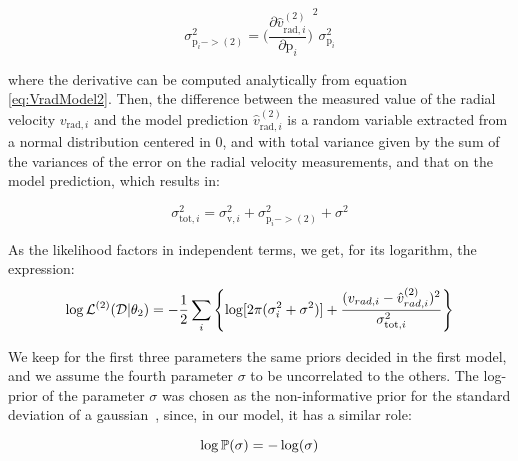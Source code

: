 \begin{equation}\label{eq:ParallaxErrorPropagation}
    \sigma^2_{\text{p}_i -> (2)} = {\biggl( \frac{\partial \hat{v}^{(2)}_{\text{rad}, i}}{\partial \text{p}_i} \biggr)}^2 \sigma^2_{\text{p}_i}
\end{equation}

\noindent
where the derivative can be computed analytically from equation \ref{eq:VradModel2}.
Then, the difference between the measured value of the radial velocity $v_{\text{rad}, i}$ and the model prediction $\hat{v}^{(2)}_{\text{rad}, i}$ is a random variable extracted from a normal distribution centered in 0, and with total variance given by the sum of the variances of the error on the radial velocity measurements, and that on the model prediction, which results in:

\begin{equation}\label{eq:ErrorPropagation}
    \sigma^2_{\text{tot}, i} = \sigma^2_{\text{v},i} + \sigma^2_{\text{p}_i -> (2)} + \sigma^2
\end{equation}

\noindent
As the likelihood factors in independent terms, we get, for its logarithm, the expression:
\begin{equation}\label{Eq:LogLikeMod2}
    \log \mathbb{\mathcal{L}}^{(2)}(\mathcal{D} \vert \theta_2) = -\frac{1}{2}\sum_i\left\{\log[2\pi(\sigma_{i}^2+\sigma^2)]+\frac{(v_{rad,i} - \hat{v}_{rad,i}^{(2)})^2}{\sigma_{\text{tot}, i}^2}\right\}
\end{equation}

We keep for the first three parameters the same priors decided in the first model, and we assume the fourth parameter $\sigma$ to be uncorrelated to the others. %
The log-prior of the parameter $\sigma$ was chosen as the non-informative prior for the standard deviation of a gaussian~\cite{mackay2003}, since, in our model, it has a similar role:

\begin{equation}\label{eq:LogPriorSigma}
    \log \mathbb{P} (\sigma) = - \log(\sigma)
\end{equation}

